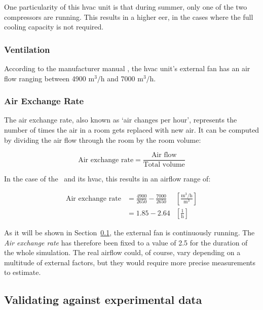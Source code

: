 One particularity of this \acrshort{hvac} unit is that during summer, only one
of the two compressors are running. This results in a higher \acrshort{eer}, in
the cases where the full cooling capacity is not required.

\subsubsection*{Ventilation}

According to the manufacturer manual \cite{aermecRoofTopManuelSelection}, the
\acrshort{hvac} unit's external fan has an air flow ranging between 4900
$\text{m}^3/\text{h}$ and 7000 $\text{m}^3/\text{h}$.

\subsubsection*{Air Exchange Rate}\label{sec:Air_Exchange_Rate}

The air exchange rate, also known as `air changes per hour', represents the
number of times the air in a room gets replaced with new air. It can be
computed by dividing the air flow through the room by the room volume:

\begin{equation}
    \text{Air exchange rate} = \frac{\text{Air flow}}{\text{Total volume}}
\end{equation}

In the case of the \pdome\ and its \acrshort{hvac}, this results in an airflow
range of:

\begin{equation}
    \begin{aligned}
        \text{Air exchange rate} &= \frac{4900}{2650} 
        - \frac{7000}{2650} &\left[\frac{\text{m}^3/\text{h}}{\text{m}^3}\right]\\
                            &= 1.85 - 2.64 &\left[\frac{1}{\text{h}}\right]
    \end{aligned}
\end{equation}

As it will be shown in Section~\ref{sec:CARNOT_experimental}, the external fan
is continuously running. The \textit{Air exchange rate} has therefore been fixed
to a value of 2.5 for the duration of the whole simulation. The real airflow
could, of course, vary depending on a multitude of external factors, but they
would require more precise measurements to estimate.

\subsection{Validating against experimental data}\label{sec:CARNOT_experimental}

